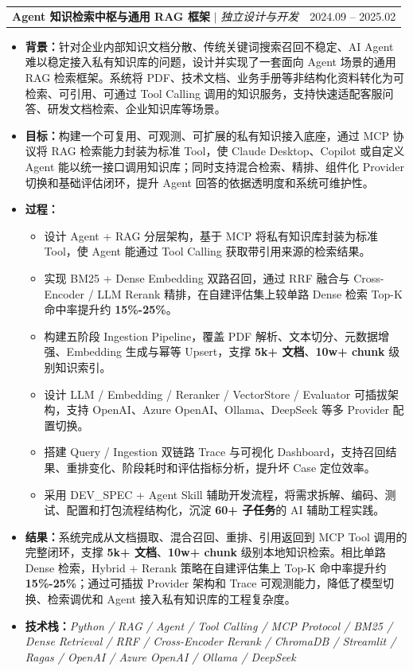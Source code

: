 \documentclass[letterpaper,10pt]{article}
\makeatletter
\newcommand{\resumeItem}[1]{
  \item\small{{#1 \vspace{2pt}}}
}
\newcommand{\resumeProjectHeading}[2]{
    \vspace{2pt}\item
    \begin{tabular*}{0.97\textwidth}{l@{\extracolsep{\fill}}r}
      \small#1 & #2 \\
    \end{tabular*}\vspace{0pt}
}
\newcommand{\resumeItemListStart}{\begin{itemize}[itemsep=0pt, parsep=0pt, topsep=2pt]}
\newcommand{\resumeItemListEnd}{\end{itemize}\vspace{4pt}}
\makeatother
\begin{document}
  \resumeProjectHeading
    {\textbf{Agent 知识检索中枢与通用 RAG 框架} $|$ \emph{独立设计与开发}}{2024.09 -- 2025.02}
  \resumeItemListStart
    \resumeItem{\textbf{背景：}针对企业内部知识文档分散、传统关键词搜索召回不稳定、AI Agent 难以稳定接入私有知识库的问题，设计并实现了一套面向 Agent 场景的通用 RAG 检索框架。系统将 PDF、技术文档、业务手册等非结构化资料转化为可检索、可引用、可通过 Tool Calling 调用的知识服务，支持快速适配客服问答、研发文档检索、企业知识库等场景。}
    \resumeItem{\textbf{目标：}构建一个可复用、可观测、可扩展的私有知识接入底座，通过 MCP 协议将 RAG 检索能力封装为标准 Tool，使 Claude Desktop、Copilot 或自定义 Agent 能以统一接口调用知识库；同时支持混合检索、精排、组件化 Provider 切换和基础评估闭环，提升 Agent 回答的依据透明度和系统可维护性。}
    \resumeItem{\textbf{过程：}}
    \vspace{-6pt}
    \begin{itemize}[leftmargin=0.22in, itemsep=0pt, parsep=0pt, topsep=0pt]
      \item \small{设计 Agent + RAG 分层架构，基于 MCP 将私有知识库封装为标准 Tool，使 Agent 能通过 Tool Calling 获取带引用来源的检索结果。}
      \item \small{实现 BM25 + Dense Embedding 双路召回，通过 RRF 融合与 Cross-Encoder / LLM Rerank 精排，在自建评估集上较单路 Dense 检索 Top-K 命中率提升约 \textbf{15\%-25\%}。}
      \item \small{构建五阶段 Ingestion Pipeline，覆盖 PDF 解析、文本切分、元数据增强、Embedding 生成与幂等 Upsert，支撑 \textbf{5k+ 文档}、\textbf{10w+ chunk} 级别知识索引。}
      \item \small{设计 LLM / Embedding / Reranker / VectorStore / Evaluator 可插拔架构，支持 OpenAI、Azure OpenAI、Ollama、DeepSeek 等多 Provider 配置切换。}
      \item \small{搭建 Query / Ingestion 双链路 Trace 与可视化 Dashboard，支持召回结果、重排变化、阶段耗时和评估指标分析，提升坏 Case 定位效率。}
      \item \small{采用 DEV\_SPEC + Agent Skill 辅助开发流程，将需求拆解、编码、测试、配置和打包流程结构化，沉淀 \textbf{60+ 子任务}的 AI 辅助工程实践。}
    \end{itemize}
    \vspace{-2pt}
    \resumeItem{\textbf{结果：}系统完成从文档摄取、混合召回、重排、引用返回到 MCP Tool 调用的完整闭环，支撑 \textbf{5k+ 文档}、\textbf{10w+ chunk} 级别本地知识检索。相比单路 Dense 检索，Hybrid + Rerank 策略在自建评估集上 Top-K 命中率提升约 \textbf{15\%-25\%}；通过可插拔 Provider 架构和 Trace 可观测能力，降低了模型切换、检索调优和 Agent 接入私有知识库的工程复杂度。}
    \resumeItem{\textbf{技术栈：}\emph{Python / RAG / Agent / Tool Calling / MCP Protocol / BM25 / Dense Retrieval / RRF / Cross-Encoder Rerank / ChromaDB / Streamlit / Ragas / OpenAI / Azure OpenAI / Ollama / DeepSeek}}
  \resumeItemListEnd
\end{document}
